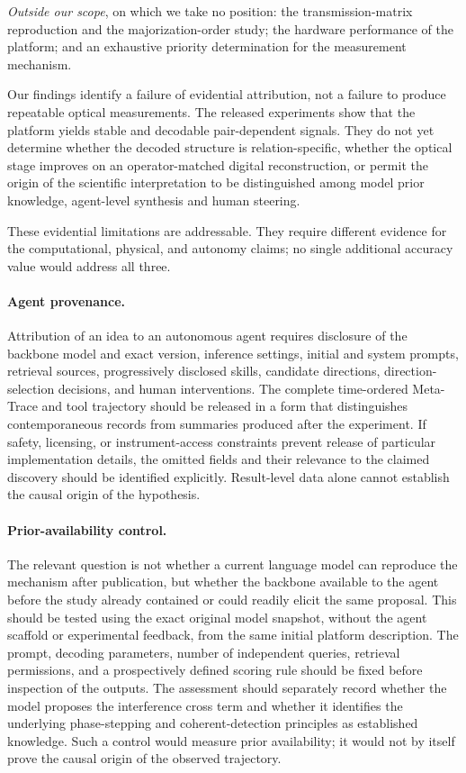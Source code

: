 \documentclass[11pt,a4paper]{article}
\begin{document}
\emph{Outside our scope}, on which we take no position: the transmission-matrix
reproduction and the majorization-order study; the hardware performance of the
platform; and an exhaustive priority determination for the measurement
mechanism.

Our findings identify a failure of evidential attribution, not a failure to
produce repeatable optical measurements. The released experiments show that
the platform yields stable and decodable pair-dependent signals. They do not
yet determine whether the decoded structure is relation-specific, whether the
optical stage improves on an operator-matched digital reconstruction, or
permit the origin of the scientific interpretation to be distinguished among
model prior knowledge, agent-level synthesis and human steering.

These evidential limitations are addressable. They require different evidence for the
computational, physical, and autonomy claims; no single additional accuracy
value would address all three.

\paragraph{Agent provenance.}
Attribution of an idea to an autonomous agent requires disclosure of the
backbone model and exact version, inference settings, initial and system
prompts, retrieval sources, progressively disclosed skills, candidate
directions, direction-selection decisions, and human interventions. The
complete time-ordered Meta-Trace and tool trajectory should be released in a
form that distinguishes contemporaneous records from summaries produced
after the experiment. If safety, licensing, or instrument-access constraints
prevent release of particular implementation details, the omitted fields and
their relevance to the claimed discovery should be identified explicitly.
Result-level data alone cannot establish the causal origin of the hypothesis.

\paragraph{Prior-availability control.}
The relevant question is not whether a current language model can reproduce
the mechanism after publication, but whether the backbone available to the
agent before the study already contained or could readily elicit the same
proposal. This should be tested using the exact original model snapshot,
without the agent scaffold or experimental feedback, from the same initial
platform description. The prompt, decoding parameters, number of independent
queries, retrieval permissions, and a prospectively defined scoring rule
should be fixed before inspection of the outputs. The assessment should
separately record whether the model proposes the interference cross term and
whether it identifies the underlying phase-stepping and coherent-detection
principles as established knowledge. Such a control would measure prior
availability; it would not by itself prove the causal origin of the observed
trajectory.
\end{document}
